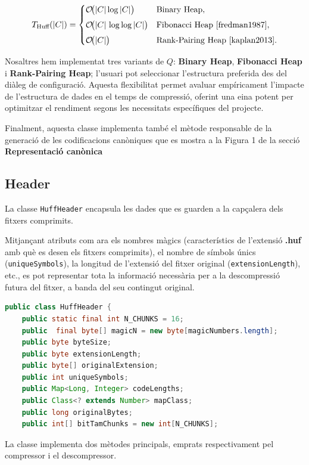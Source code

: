 \documentclass{ieeetj}
\begin{document}
\begin{equation}
T_{\text{Huff}}(|C|)=
  \begin{cases}
    \mathcal{O}\!\bigl(|C|\log |C|\bigr)      & \text{Binary Heap},\\[4pt]
    \mathcal{O}\!\bigl(|C|\,\log \log|C|\bigr) & \text{Fibonacci Heap \cite{fredman1987}},\\[4pt]
    \mathcal{O}\!\bigl(|C|\bigr)  & \text{Rank-Pairing Heap \cite{kaplan2013}}.
  \end{cases}
\end{equation}

Nosaltres hem implementat tres variants de $Q$: \textbf{Binary Heap}, \textbf{Fibonacci Heap} i \textbf{Rank-Pairing Heap}; l’usuari pot seleccionar l’estructura preferida des del diàleg de configuració. Aquesta flexibilitat permet avaluar empíricament l’impacte de l’estructura de dades en el temps de compressió, oferint una eina potent per optimitzar el rendiment segons les necessitats específiques del projecte.\newline

Finalment, aquesta classe implementa també el mètode responsable de la generació de les codificacions canòniques que es mostra a la Figura 1 de la secció \textbf{Representació canònica}

\subsection{Header}
La classe \texttt{HuffHeader} encapsula les dades que es guarden a la capçalera dels fitxers comprimits.

Mitjançant atributs com ara els nombres màgics (característics de l'extensió \textbf{.huf} amb què es desen els fitxers comprimits), el nombre de símbols únics (\texttt{uniqueSymbols}), la longitud de l'extensió del fitxer original (\texttt{extensionLength}), etc., es pot representar tota la informació necessària per a la descompressió futura del fitxer, a banda del seu contingut original.\newline

\begin{lstlisting}[language= Java, breaklines = true]
public class HuffHeader {
    public static final int N_CHUNKS = 16;
    public  final byte[] magicN = new byte[magicNumbers.length];
    public byte byteSize;
    public byte extensionLength;
    public byte[] originalExtension;
    public int uniqueSymbols;
    public Map<Long, Integer> codeLengths;
    public Class<? extends Number> mapClass;
    public long originalBytes;
    public int[] bitTamChunks = new int[N_CHUNKS];
\end{lstlisting}
La classe implementa dos mètodes principals, emprats respectivament pel compressor i el descompressor.\newline
\end{document}
